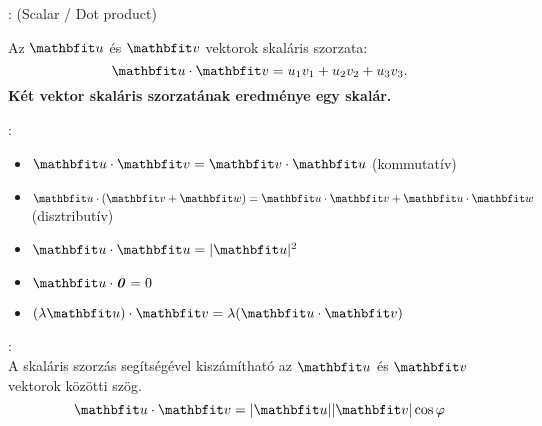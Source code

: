 \documentclass[a4paper, 12pt]{scrartcl}
\begin{document}
\begin{blueBox}
  : (Scalar / Dot product)

  Az $\rvec u$ és $\rvec v$ vektorok skaláris szorzata:
  \[
    \rvec u \cdot \rvec v = u_1 v_1 + u_2 v_2 + u_3 v_3
    \text.
  \]
  \textbf{Két vektor skaláris szorzatának eredménye egy skalár.}
\end{blueBox}

\begin{note}
  :
  \begin{itemize}
    \item $\rvec u \cdot \rvec v = \rvec v \cdot \rvec u$
          (kommutatív)

    \item $\rvec u \cdot (\rvec v + \rvec w) =
            \rvec u \cdot \rvec v + \rvec u \cdot \rvec w$
          (disztributív)

    \item $\rvec u \cdot \rvec u = |\rvec u|^2$

    \item $\rvec u \cdot \nvec = 0$

    \item $(\lambda \rvec u) \cdot \rvec v = \lambda (\rvec u \cdot \rvec v)$
  \end{itemize}
\end{note}

\begin{note}
  \begin{minipage}{.6\textwidth}
    :\\[3mm]
    A skaláris szorzás segítségével kiszámítható az $\rvec u$ és $\rvec v$
    vektorok közötti szög.
    \[
      \rvec u \cdot \rvec v = |\rvec u| |\rvec v| \cos \varphi
    \]
  \end{minipage}\begin{minipage}{.4\textwidth}
    \centering
  \end{minipage}
\end{note}
\end{document}
